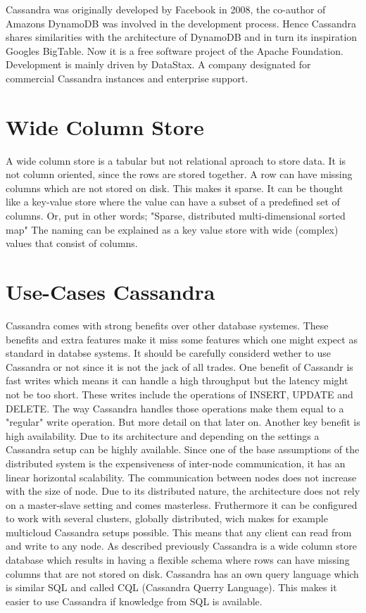 Cassandra was originally developed by Facebook in 2008, the co-author of Amazons DynamoDB was involved
in the development process. Hence Cassandra shares similarities with the architecture of DynamoDB and in turn its inspiration Googles BigTable.
Now it is a free software project of the Apache Foundation. Development is mainly driven by DataStax.
A company designated for commercial Cassandra instances and enterprise support.


\section{Wide Column Store}

A wide column store is a tabular but not relational aproach to store data. It is not column oriented, since the rows are stored together. A row can have missing columns which are not stored on disk. This makes it sparse.
It can be thought like a key-value store where the value can have a subset of a predefined set of columns. Or, put in other words; "Sparse, distributed multi-dimensional sorted map" \cite{chang2008bigtable}
The naming can be explained as a key value store with wide (complex) values that consist of columns.


\section{Use-Cases Cassandra}
Cassandra comes with strong benefits over other database systemes. These benefits and extra features make it miss some features which one might expect as standard in databse systems.
It should be carefully considerd wether to use Cassandra or not since it is not the jack of all trades.
One benefit of Cassandr is fast writes which means it can handle a high throughput but the latency might not be too short. These writes include the operations of {INSERT}, {UPDATE} and {DELETE}. 
The way Cassandra handles those operations make them equal to a "regular" write operation. But more detail on that later on. Another key benefit is high availability. Due to its architecture and depending on the settings 
a Cassandra setup can be highly available. Since one of the base assumptions of the distributed system is the expensiveness of inter-node communication, it has an linear horizontal scalability. 
The communication between nodes does not increase with the size of node. Due to its distributed nature, the architecture does not rely on a master-slave setting and comes masterless. 
Fruthermore it can be configured to work with several clusters, globally distributed, wich makes for example multicloud Cassandra setups possible.
This means that any client can read from and write to any node. As described previously Cassandra is a wide column store database which results in having a flexible schema where rows can have missing columns that are not stored on disk.
Cassandra has an own query language which is similar SQL and called CQL (Cassandra Querry Language). This makes it easier to use Cassandra if knowledge from SQL is available.

